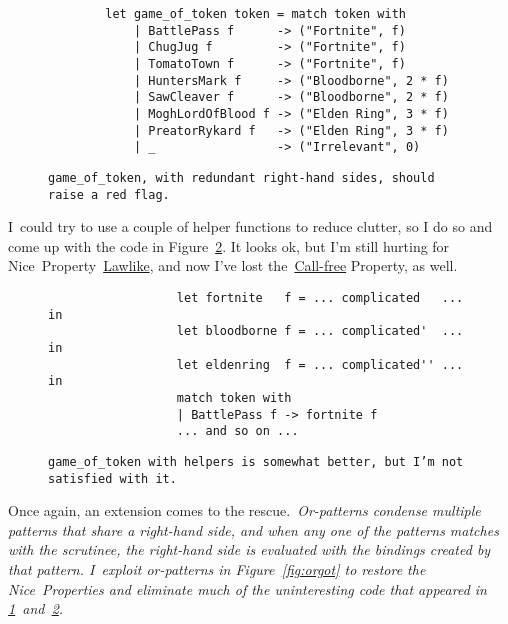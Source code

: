 \documentclass[manuscript,screen 12pt, nonacm]{acmart}
\begin{document}
        \begin{figure}
            \begin{center}
                \begin{verbatim}
        let game_of_token token = match token with 
            | BattlePass f      -> ("Fortnite", f)
            | ChugJug f         -> ("Fortnite", f)
            | TomatoTown f      -> ("Fortnite", f)
            | HuntersMark f     -> ("Bloodborne", 2 * f)
            | SawCleaver f      -> ("Bloodborne", 2 * f)
            | MoghLordOfBlood f -> ("Elden Ring", 3 * f)
            | PreatorRykard f   -> ("Elden Ring", 3 * f)
            | _                 -> ("Irrelevant", 0)
                \end{verbatim}
            \end{center}    

        \caption{\tt{game\_of\_token}, with redundant right-hand sides,
        should raise a red flag.} 
        \label{fig:baregot}
        \end{figure}

        I~could try to use a couple of helper functions to reduce clutter, so I
        do so and come up with the code in Figure~\ref{fig:helpergot}. It looks
        ok, but I'm still hurting for Nice~Property~\hyperref[p2]{Lawlike}, and
        now I've lost the~\hyperref[p3]{Call-free} Property, as well.

        \begin{figure}
            \begin{center}
                \begin{verbatim}
                  let fortnite   f = ... complicated   ... in
                  let bloodborne f = ... complicated'  ... in
                  let eldenring  f = ... complicated'' ... in
                  match token with
                  | BattlePass f -> fortnite f
                  ... and so on ...                
                \end{verbatim}
            \end{center}    
        \caption{\tt{game\_of\_token} with helpers is somewhat better, but I'm
        not satisfied with it.} 
        \label{fig:helpergot}
        \end{figure}

        Once again, an extension comes to the rescue.~\it{Or-patterns} condense
        multiple patterns that share a right-hand side, and when any one of the
        patterns matches with the scrutinee, the right-hand side is evaluated
        with the bindings created by that pattern. I~exploit or-patterns in
        Figure~\ref{fig:orgot} to restore the Nice~Properties and eliminate much
        of the uninteresting code that appeared in
        \ref{fig:baregot}~and~\ref{fig:helpergot}. 
\end{document}
